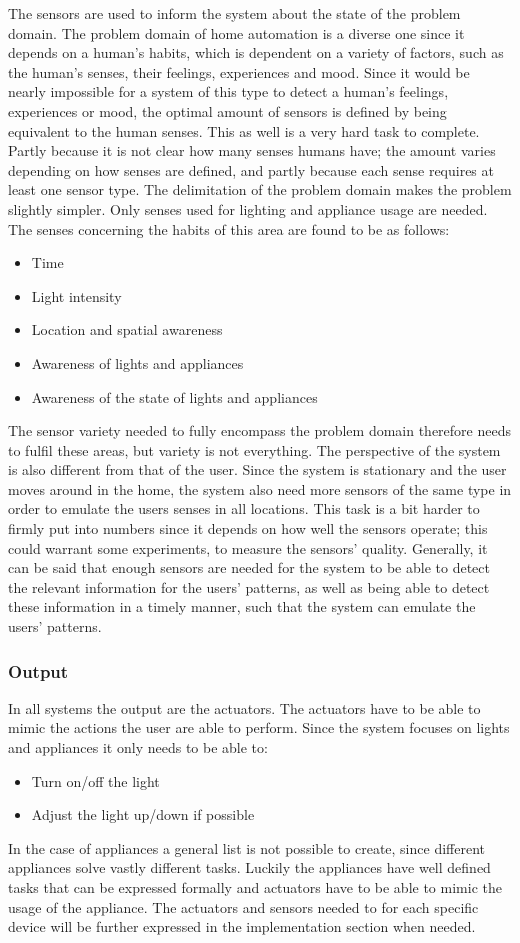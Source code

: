 The sensors are used to inform the system about the state of the problem domain. The problem domain of home automation is a diverse one since it depends on a human's habits, which is dependent on a variety of factors, such as the human's senses, their feelings, experiences and mood. Since it would be nearly impossible for a system of this type to detect a human's feelings, experiences or mood, the optimal amount of sensors is defined by being equivalent to the human senses. This as well is a very hard task to complete. Partly because it is not clear how many senses humans have; the amount varies depending on how senses are defined, and partly because each sense requires at least one sensor type. The delimitation of the problem domain makes the problem slightly simpler. Only senses used for lighting and appliance usage are needed. The senses concerning the habits of this area are found to be as follows:
\begin{itemize}
	\item Time
	\item Light intensity
	\item Location and spatial awareness
	\item Awareness of lights and appliances
  \item Awareness of the state of lights and appliances
\end{itemize}
The sensor variety needed to fully encompass the problem domain therefore needs to fulfil these areas, but variety is not everything. The perspective of the system is also different from that of the user. Since the system is stationary and the user moves around in the home, the system also need more sensors of the same type in order to emulate the users senses in all locations. This task is a bit harder to firmly put into numbers since it depends on how well the sensors operate; this could warrant some experiments, to measure the sensors' quality. Generally, it can be said that enough sensors are needed for the system to be able to detect the relevant information for the users' patterns, as well as being able to detect these information in a timely manner, such that the system can emulate the users' patterns.

\subsubsection{Output}
In all systems the output are the actuators. The actuators have to be able to mimic the actions the user are able to perform. Since the system focuses on lights and appliances it only needs to be able to:
\begin{itemize}
	\item Turn on/off the light
	\item Adjust the light up/down if possible
\end{itemize}
In the case of appliances a general list is not possible to create, since different appliances solve vastly different tasks. Luckily the appliances have well defined tasks that can be expressed formally and actuators have to be able to mimic the usage of the appliance. The actuators and sensors needed to for each specific device will be further expressed in the implementation section when needed.

